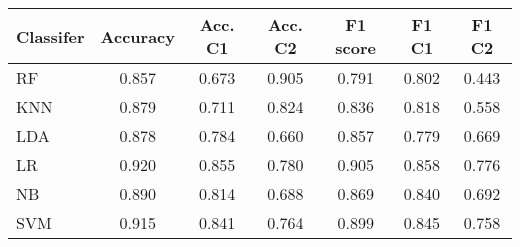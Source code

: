 \begin{tabular}{l|c|c|c|c|c|c}
\toprule
Classifer &  Accuracy &  Acc. C1 &  Acc. C2 &  F1 score &  F1 C1 &  F1 C2 \\
\midrule
       RF &     0.857 &    0.673 &    0.905 &     0.791 &  0.802 &  0.443 \\
      KNN &     0.879 &    0.711 &    0.824 &     0.836 &  0.818 &  0.558 \\
      LDA &     0.878 &    0.784 &    0.660 &     0.857 &  0.779 &  0.669 \\
       LR &     0.920 &    0.855 &    0.780 &     0.905 &  0.858 &  0.776 \\
       NB &     0.890 &    0.814 &    0.688 &     0.869 &  0.840 &  0.692 \\
      SVM &     0.915 &    0.841 &    0.764 &     0.899 &  0.845 &  0.758 \\
\bottomrule
\end{tabular}
